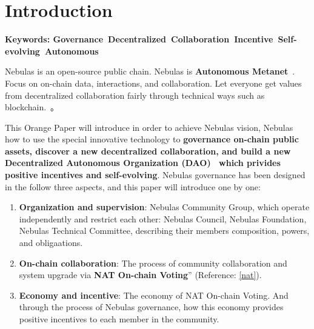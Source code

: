 
\section{Introduction}

\textbf{Keywords: Governance\ Decentralized\ Collaboration\ Incentive\ Self-evolving\ Autonomous }

\vspace{2em}

Nebulas is an open-source public chain. Nebulas is \textbf{Autonomous Metanet}~\cite{AutonomousMetanet}. Focus on on-chain data, interactions, and collaboration. Let everyone get values from decentralized collaboration fairly through technical ways such as blockchain.~\cite{vision}。

This Orange Paper will introduce in order to achieve Nebulas vision, Nebulas how to use the special innovative technology to \textbf{governance on-chain public assets, discover a new decentralized collaboration, and build a new Decentralized Autonomous Organization (DAO)~\cite{DAO} which privides positive incentives and self-evolving}. Nebulas governance has been designed in the follow three aspects, and this paper will introduce one by one:

\begin{enumerate}
	\item \textbf{Organization and supervision}:
	Nebulas Community Group, which operate independently and restrict each other: Nebulas Council, Nebulas Foundation, Nebulas Technical Committee, describing their members composition, powers, and obligaations.
	\item \textbf{On-chain collaboration}:
	The process of community collaboration and system upgrade via \textbf{NAT On-chain Voting}” (Reference: \ref{nat}).
	\item \textbf{Economy and incentive}: 
	The economy of NAT On-chain Voting. And through the process of Nebulas governance, how this economy provides positive incentives to each member in the community.
\end{enumerate}
